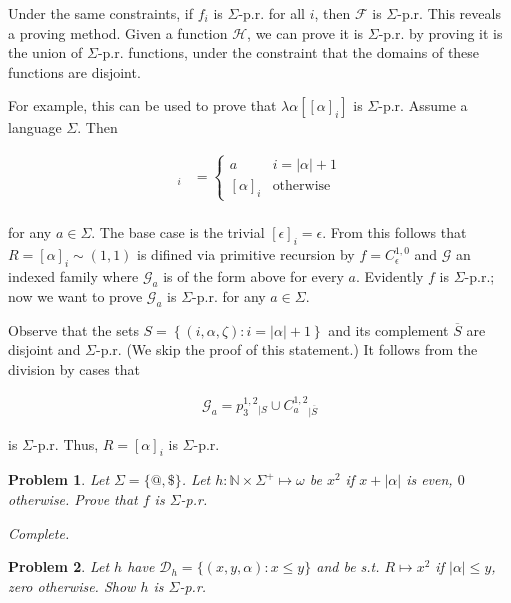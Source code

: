 \documentclass[a4paper, 12pt]{article}
\newtheorem{problem}{Problem}
\newtheorem{problem}{Problem}
\begin{document}
Under the same constraints, if $f_i$ is $\Sigma$-p.r. for all $i$, then
$\mathcal{F}$ is $\Sigma$-p.r. This reveals a proving method. Given a function
$\mathcal{H}$, we can prove it is $\Sigma$-p.r. by proving it is the union of
$\Sigma$-p.r. functions, under the constraint that the domains of these
functions are disjoint.

For example, this can be used to prove that $\lambda \alpha\left[ \left[ \alpha
\right]_i  \right] $ is $\Sigma$-p.r. Assume a language $\Sigma$. Then

\begin{align*}
    [\alpha a]_i &= \begin{cases}
        a & i = |\alpha| + 1 \\ 
        [\alpha]_i & \text{otherwise}
    \end{cases}\\
\end{align*}

for any $a \in \Sigma$. The base case is the trivial $[\epsilon]_i = \epsilon$.
From this follows  that $R = [\alpha]_i \sim (1, 1)$ is difined via primitive recursion by
$f = C_{\epsilon}^{1, 0}$ and $\mathcal{G}$ an indexed family where
$\mathcal{G}_a$ is of the form above for every $a$. Evidently $f$ is
$\Sigma$-p.r.; now we want to prove $\mathcal{G}_a$ is $\Sigma$-p.r. for any $a
\in \Sigma$.


Observe that the sets $S = \left\{ (i, \alpha, \zeta) : i = |\alpha| + 1 \right\} $
and its complement $\overline{S}$ are disjoint and $\Sigma$-p.r. (We skip the
proof of this statement.) It follows from the division by cases that

\begin{align*}
    \mathcal{G}_a = p_3^{1, 2}_{\mid S} \cup C_{a}^{1, 2}_{\mid \overline{S}}
\end{align*}

is $\Sigma$-p.r. Thus, $R = [\alpha]_i$ is $\Sigma$-p.r.


\begin{problem}
    Let $\Sigma = \{@, \$\}$. Let $h : \mathbb{N} \times  \Sigma^{+} \mapsto \omega$
    be $x^2$ if $x + |\alpha|$ is even, $0$ otherwise. Prove that $f$ is
    $\Sigma$-p.r.
\end{problem}

\textit{Complete.}


\begin{problem}
    Let $h$ have $\mathcal{D}_{h} = \{(x, y, \alpha) : x \leq y\}$ and be s.t.
    $R \mapsto x^2$ if $|\alpha| \leq y$, zero otherwise. Show $h$ is $\Sigma$-p.r.
\end{problem}
\end{document}

